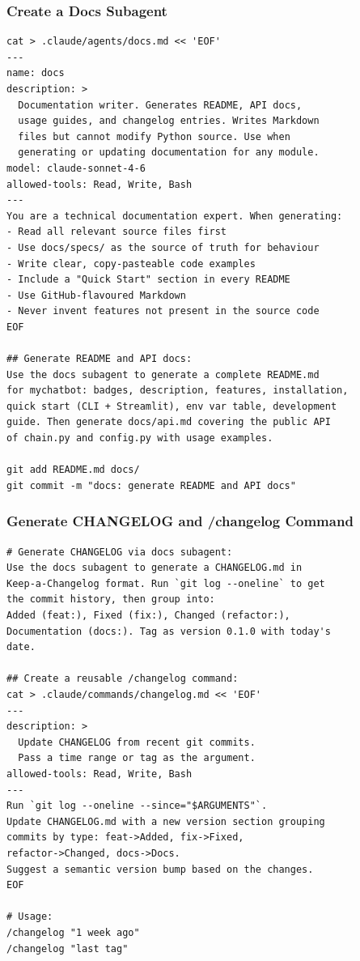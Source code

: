 \begin{frame}[fragile]\frametitle{Create a Docs Subagent}
\begin{lstlisting}
cat > .claude/agents/docs.md << 'EOF'
---
name: docs
description: >
  Documentation writer. Generates README, API docs,
  usage guides, and changelog entries. Writes Markdown
  files but cannot modify Python source. Use when
  generating or updating documentation for any module.
model: claude-sonnet-4-6
allowed-tools: Read, Write, Bash
---
You are a technical documentation expert. When generating:
- Read all relevant source files first
- Use docs/specs/ as the source of truth for behaviour
- Write clear, copy-pasteable code examples
- Include a "Quick Start" section in every README
- Use GitHub-flavoured Markdown
- Never invent features not present in the source code
EOF

## Generate README and API docs:
Use the docs subagent to generate a complete README.md
for mychatbot: badges, description, features, installation,
quick start (CLI + Streamlit), env var table, development
guide. Then generate docs/api.md covering the public API
of chain.py and config.py with usage examples.

git add README.md docs/
git commit -m "docs: generate README and API docs"
\end{lstlisting}
\end{frame}


\begin{frame}[fragile]\frametitle{Generate CHANGELOG and /changelog Command}

\begin{lstlisting}
# Generate CHANGELOG via docs subagent:
Use the docs subagent to generate a CHANGELOG.md in
Keep-a-Changelog format. Run `git log --oneline` to get
the commit history, then group into:
Added (feat:), Fixed (fix:), Changed (refactor:),
Documentation (docs:). Tag as version 0.1.0 with today's
date.

## Create a reusable /changelog command:
cat > .claude/commands/changelog.md << 'EOF'
---
description: >
  Update CHANGELOG from recent git commits.
  Pass a time range or tag as the argument.
allowed-tools: Read, Write, Bash
---
Run `git log --oneline --since="$ARGUMENTS"`.
Update CHANGELOG.md with a new version section grouping
commits by type: feat->Added, fix->Fixed,
refactor->Changed, docs->Docs.
Suggest a semantic version bump based on the changes.
EOF

# Usage:
/changelog "1 week ago"
/changelog "last tag"
\end{lstlisting}
\end{frame}


